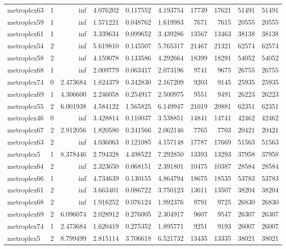\begin{longtable}{|l|r|r|r|r|r|r|r|r|r|}
metroplex63 & 1 & inf & 4.076202 & 0.117552 & 4.193754 & 17739 & 17621 & 51491 & 51491 \\
metroplex59 & 1 & inf & 1.571221 & 0.048762 & 1.619983 & 7671 & 7615 & 20555 & 20555 \\
metroplex61 & 1 & inf & 3.339634 & 0.099652 & 3.439286 & 13567 & 13463 & 38138 & 38138 \\
metroplex54 & 2 & inf & 5.619810 & 0.145507 & 5.765317 & 21467 & 21321 & 62574 & 62574 \\
metroplex58 & 2 & inf & 4.159078 & 0.133586 & 4.292664 & 18399 & 18291 & 54052 & 54052 \\
metroplex68 & 1 & inf & 2.009779 & 0.063417 & 2.073196 & 9741 & 9675 & 26755 & 26755 \\
metroplex74 & 0 & 2.473684 & 1.824379 & 0.342830 & 2.167209 & 9203 & 9145 & 25935 & 25935 \\
metroplex69 & 1 & 4.306600 & 2.246058 & 0.254917 & 2.500975 & 9551 & 9491 & 26223 & 26223 \\
metroplex55 & 2 & 6.001938 & 4.584122 & 1.565825 & 6.149947 & 21019 & 20881 & 62351 & 62351 \\
metroplex46 & 0 & inf & 3.428814 & 0.110037 & 3.538851 & 14841 & 14741 & 42462 & 42462 \\
metroplex67 & 2 & 2.912056 & 1.820580 & 0.241566 & 2.062146 & 7765 & 7703 & 20421 & 20421 \\
metroplex63 & 2 & inf & 4.036063 & 0.121085 & 4.157148 & 17787 & 17669 & 51563 & 51563 \\
metroplex5 & 1 & 8.378446 & 2.794328 & 4.498522 & 7.292850 & 13393 & 13293 & 37958 & 37958 \\
metroplex64 & 2 & inf & 2.323650 & 0.068151 & 2.391801 & 10475 & 10387 & 28584 & 28584 \\
metroplex66 & 1 & inf & 4.734639 & 0.130155 & 4.864794 & 18675 & 18535 & 53783 & 53783 \\
metroplex61 & 2 & inf & 3.663401 & 0.086722 & 3.750123 & 13611 & 13507 & 38204 & 38204 \\
metroplex68 & 2 & inf & 1.916252 & 0.076124 & 1.992376 & 9791 & 9725 & 26830 & 26830 \\
metroplex69 & 2 & 6.096074 & 2.028912 & 0.276005 & 2.304917 & 9607 & 9547 & 26307 & 26307 \\
metroplex74 & 1 & 2.473684 & 1.620419 & 0.275352 & 1.895771 & 9251 & 9193 & 26007 & 26007 \\
metroplex5 & 2 & 8.799499 & 2.815114 & 3.706618 & 6.521732 & 13435 & 13335 & 38021 & 38021 \\

\end{longtable}
